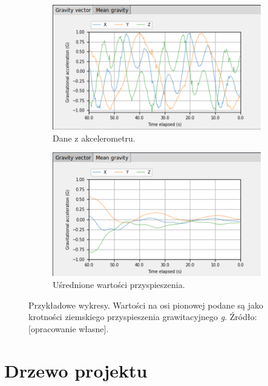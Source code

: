 \begin{figure}[h]
	\centering
	
	\begin{subfigure}[h]{.49\textwidth}
		\centering
		\includegraphics[scale=1.7]{grav_surowe}
		\caption{Dane z akcelerometru.}
		\label{fig:grav_raw}
	\end{subfigure}
	\hfill%
	\begin{subfigure}[h]{.49\textwidth}
		\centering
		\includegraphics[scale=1.7]{grav_sr}
		\caption{Uśrednione wartości przyspieszenia.} 
		\label{fig:grav_mean}
	\end{subfigure}
	
	\caption{Przykładowe wykresy. Wartości na osi pionowej podane są jako krotności ziemskiego przyspieszenia grawitacyjnego \textit{g}. Źródło: [opracowanie własne].}
	\label{fig:wykresy_gui}
	
\end{figure}

\section{Drzewo projektu}

